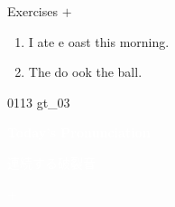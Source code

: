 \documentclass[aspectratio=169,xcolor={dvipsnames,table}]{beamer}
\begin{document}
\begin{frame}[plain]{Exercises  $+$ }
  \Large
  \begin{enumerate}
    \item<2-> I ate e  oast this morning.
    \item<4-> The do  ook the ball.
  \end{enumerate}


  \hfill{\tiny 0113}\,{\scriptsize {}\,gt\_03}

\end{frame}
\begin{frame}
  \hypertarget{today}{}
  \centering
  \textcolor{white}{\Huge\bfseries Today's Pronunciation}

  \vspace{30pt}

  \textcolor{white}{\Large 連続する破裂音}

  \textcolor{white}{\Large {} $+$ }
\end{frame}
\end{document}
